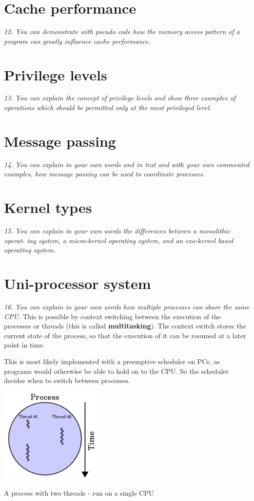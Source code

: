 \documentclass{article}
\begin{document}
\section{Cache performance}
\emph{12. You can demonstrate with pseudo code how the memory access pattern of a program can greatly influence cache performance.}



\section{Privilege levels}
\emph{13. You can explain the concept of privilege levels and show three examples of operations which should be permitted only at the most privileged level.}



\section{Message passing}
\emph{14. You can explain in your own words and in text and with your own commented examples, how message passing can be used to coordinate processes.}



\section{Kernel types}
\emph{15. You can explain in your own words the differences between a monolithic operat-
ing system, a micro-kernel operating system, and an exo-kernel based operating
system.}



\section{Uni-processor system}
\emph{16. You can explain in your own words how multiple processes can share the same CPU.}
This is possible by context switching between the execution of the processes or threads (this is called \textbf{multitasking}). The context switch stores the current state of the process, so that the execution of it can be resumed at a later point in time.

This is most likely implemented with a preemptive scheduler on PCs, as programs would otherwise be able to hold on to the CPU. So the scheduler decides when to switch between processes.

\begin{center}
\includegraphics[width=5.0cm]{images/220px-Multithreaded_process.png}

A process with two threads - run on a single CPU
\end{center}
\end{document}
